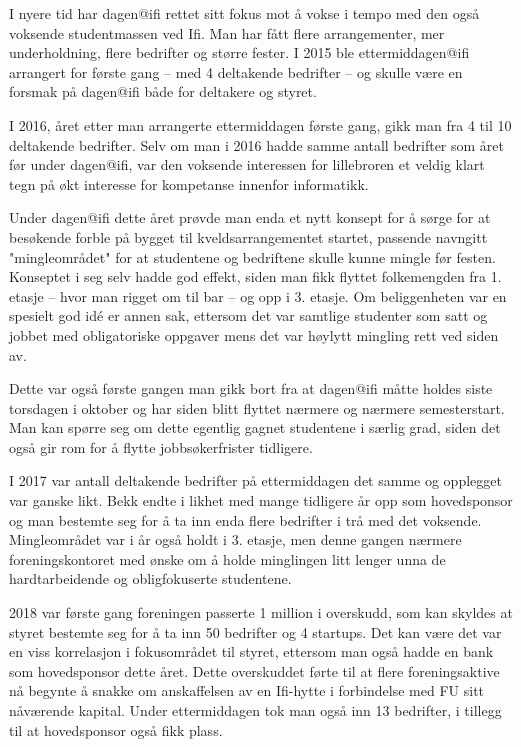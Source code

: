 \author{Skrevet av Karl H. Totland}

I nyere tid har dagen@ifi rettet sitt fokus mot å vokse i tempo med den også voksende studentmassen ved Ifi. Man har fått flere arrangementer, mer underholdning, flere bedrifter og større fester. I 2015 ble ettermiddagen@ifi arrangert for første gang -- med 4 deltakende bedrifter -- og skulle være en forsmak på dagen@ifi både for deltakere og styret.

I 2016, året etter man arrangerte ettermiddagen første gang, gikk man fra 4 til 10 deltakende bedrifter. Selv om man i 2016 hadde samme antall bedrifter som året før under dagen@ifi, var den voksende interessen for lillebroren et veldig klart tegn på økt interesse for kompetanse innenfor informatikk.

Under dagen@ifi dette året prøvde man enda et nytt konsept for å sørge for at besøkende forble på bygget til kveldsarrangementet startet, passende navngitt "mingleområdet" for at studentene og bedriftene skulle kunne mingle før festen. Konseptet i seg selv hadde god effekt, siden man fikk flyttet folkemengden fra 1. etasje -- hvor man rigget om til bar -- og opp i 3. etasje. Om beliggenheten var en spesielt god idé er annen sak, ettersom det var samtlige studenter som satt og jobbet med obligatoriske oppgaver mens det var høylytt mingling rett ved siden av.

Dette var også første gangen man gikk bort fra at dagen@ifi måtte holdes siste torsdagen i oktober og har siden blitt flyttet nærmere og nærmere semesterstart. Man kan spørre seg om dette egentlig gagnet studentene i særlig grad, siden det også gir rom for å flytte jobbsøkerfrister tidligere.

I 2017 var antall deltakende bedrifter på ettermiddagen det samme og opplegget var ganske likt. Bekk endte i likhet med mange tidligere år opp som hovedsponsor og man bestemte seg for å ta inn enda flere bedrifter i trå med det voksende. Mingleområdet var i år også holdt i 3. etasje, men denne gangen nærmere foreningskontoret med ønske om å holde minglingen litt lenger unna de hardtarbeidende og obligfokuserte studentene.

2018 var første gang foreningen passerte 1 million i overskudd, som kan skyldes at styret bestemte seg for å ta inn 50 bedrifter og 4 startups. Det kan være det var en viss korrelasjon i fokusområdet til styret, ettersom man også hadde en bank som hovedsponsor dette året. Dette overskuddet førte til at flere foreningsaktive nå begynte å snakke om anskaffelsen av en Ifi-hytte i forbindelse med FU sitt nåværende kapital. Under ettermiddagen tok man også inn 13 bedrifter, i tillegg til at hovedsponsor også fikk plass.

